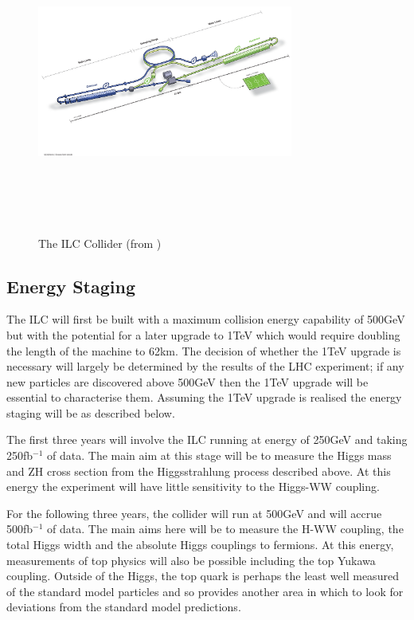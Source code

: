 \begin{figure}
  \centering
  \includegraphics[width=0.75\textwidth,height=10cm,keepaspectratio]{Experiments/fig/ILC}
  \caption[The ILC Experiment]{The \ac{ILC} Collider (from \cite{ILCTDR})}
  \label{Fig:ILC}
\end{figure}
\subsection{Energy Staging}
The \ac{ILC} will first be built with a maximum collision energy capability of 500GeV but with the potential for a later upgrade to 1TeV which would require doubling the length of the machine to 62km. The decision of whether the 1TeV upgrade is necessary will largely be determined by the results of the \ac{LHC} experiment; if any new particles are discovered above 500GeV then the 1TeV upgrade will be essential to characterise them. Assuming the 1TeV upgrade is realised the energy staging will be as described below.

The first three years will involve the ILC running at energy of 250GeV and taking 250fb${^{-1}}$ of data. The main aim at this stage will be to measure the Higgs mass and ZH cross section from the Higgsstrahlung process described above. At this energy the experiment will have little sensitivity to the Higgs-WW coupling.

For the following three years, the collider will run at 500GeV and will accrue 500fb${^{-1}}$ of data. The main aims here will be to measure the H-WW coupling, the total Higgs width and the absolute Higgs couplings to fermions. At this energy, measurements of top physics will also be possible including the top Yukawa coupling. Outside of the Higgs, the top quark is perhaps the least well measured of the standard model particles and so provides another area in which to look for deviations from the standard model predictions.

